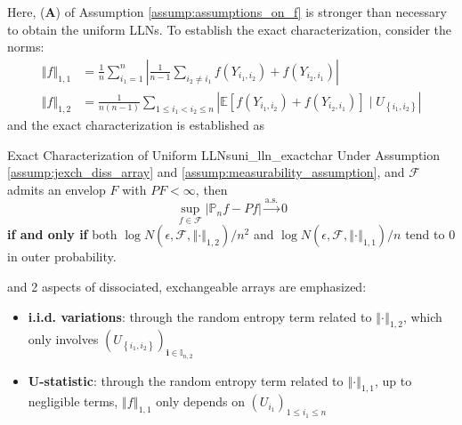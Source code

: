 \documentclass[twoside]{article}
\begin{document}
Here, (\textbf{A}) of Assumption \ref{assump:assumptions_on_f} is stronger than necessary to obtain the uniform LLNs. To establish the exact characterization, consider the norms:
\begin{align*}
    \left\Vert f \right\Vert _{1,1} &= \frac{1}{n} \sum^n_{i_1=1} \left\vert \frac{1}{n-1} \sum_{i_2 \neq i_1} f(Y_{i_1,i_2}) + f(Y_{i_2,i_1}) \right\vert \\
    \left\Vert f \right\Vert _{1,2} &= \frac{1}{n(n-1)} \sum_{1\leq i_1<i_2 \leq n} \left\vert \mathbb{E}\left[  f(Y_{i_1,i_2}) + f(Y_{i_2,i_1}) \right] \mid U_{\left\{ i_1,i_2 \right\}} \right\vert
\end{align*}
and the exact characterization is established as 
\begin{proposition}{Exact Characterization of Uniform LLNs}{uni_lln_exactchar}
    Under Assumption \ref{assump:jexch_diss_array} and \ref{assump:measurability_assumption}, and $\mathcal{F}$ admits an envelop $F$ with $PF<\infty$, then $$\sup_{f\in\mathcal{F}} \left\vert \mathbb{P}_n f -Pf \right\vert \xrightarrow{\mathrm{a.s.}} 0$$ \textbf{if and only if} both $\log N\left(\epsilon, \mathcal{F}, \left\Vert \cdot \right\Vert _{1,2}\right)/n^2$ and $\log N\left(\epsilon, \mathcal{F}, \left\Vert \cdot \right\Vert _{1,1}\right)/n$ tend to 0 in outer probability.
\end{proposition}
and 2 aspects of dissociated, exchangeable arrays are emphasized:
\begin{itemize}
    \item \textbf{i.i.d. variations}: through the random entropy term related to $\left\Vert \cdot \right\Vert _{1,2}$, which only involves $\left(U_{\left\{i_1,i_2\right\}}\right)_{\mathbf{i}\in\mathbb{I}_{n,2}}$
    \item \textbf{U-statistic}: through the random entropy term related to $\left\Vert \cdot \right\Vert _{1,1}$, up to negligible terms, $\left\Vert f \right\Vert _{1,1}$ only depends on $\left(U_{i_1}\right)_{1\leq i_1 \leq n}$
\end{itemize}
\end{document}
